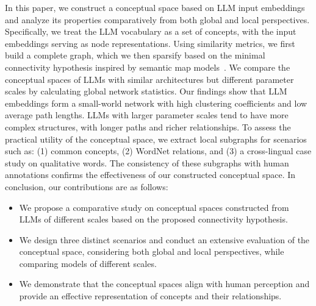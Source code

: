 In this paper, we construct a conceptual space based on LLM input embeddings and analyze its properties comparatively from both global and local perspectives. Specifically, we treat the LLM vocabulary as a set of concepts, with the input embeddings serving as node representations. Using similarity metrics, we first build a complete graph, which we then sparsify based on the minimal connectivity hypothesis inspired by semantic map models~\cite{haspelmath2003geometry,croft2003typology}. We compare the conceptual spaces of LLMs with similar architectures but different parameter scales by calculating global network statistics. Our findings show that LLM embeddings form a small-world network with high clustering coefficients and low average path lengths. LLMs with larger parameter scales tend to have more complex structures, with longer paths and richer relationships. To assess the practical utility of the conceptual space, we extract local subgraphs for scenarios such as: (1) common concepts, (2) WordNet relations, and (3) a cross-lingual case study on qualitative words. The consistency of these subgraphs with human annotations confirms the effectiveness of our constructed conceptual space.
In conclusion, our contributions are as follows:
\begin{itemize}
    \item We propose a comparative study on conceptual spaces constructed from LLMs of different scales based on the proposed connectivity hypothesis.
    \item We design three distinct scenarios and conduct an extensive evaluation of the conceptual space, considering both global and local perspectives, while comparing models of different scales.
    \item We demonstrate that the conceptual spaces align with human perception and provide an effective representation of concepts and their relationships.
\end{itemize}
